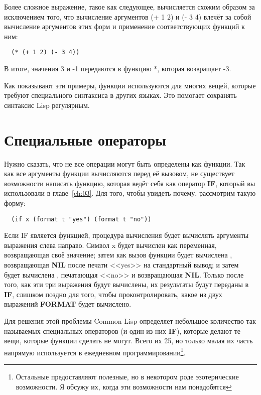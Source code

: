 Более сложное выражение, такое как следующее, вычисляется схожим образом за исключением
того, что вычисление аргументов (+ 1 2) и (- 3 4) влечёт за собой вычисление аргументов
этих форм и применение соответствующих функций к ним:

\begin{lstlisting}
  (* (+ 1 2) (- 3 4))
\end{lstlisting}

В итоге, значения 3 и -1 передаются в функцию *, которая возвращает -3.

Как показывают эти примеры, функции используются для многих вещей, которые требуют
специального синтаксиса в других языках. Это помогает сохранять синтаксис Lisp регулярным.

\section{Специальные операторы}

Нужно сказать, что не все операции могут быть определены как функции. Так как все
аргументы функции вычисляются перед её вызовом, не существует возможности написать
функцию, которая ведёт себя как оператор \textbf{IF}, который вы использовали в
главе~\ref{ch:03}. Для того, чтобы увидеть почему, рассмотрим такую форму:

\begin{lstlisting}
  (if x (format t "yes") (format t "no"))
\end{lstlisting}

Если IF является функцией, процедура вычисления будет вычислять аргументы выражения слева
направо. Символ x будет вычислен как переменная, возвращающая своё значение; затем как
вызов функции будет вычислена , возвращающая \textbf{NIL} после
печати <<yes>> на стандартный вывод; и затем будет вычислена , печатающая
<<no>> и возвращающая \textbf{NIL}. Только после того, как эти три выражения будут
вычислены, их результаты будут переданы в \textbf{IF}, слишком поздно для того, чтобы
проконтролировать, какое из двух выражений \textbf{FORMAT} будет вычислено.

Для решения этой проблемы Common Lisp определяет небольшое количество так называемых
специальных операторов (и один из них \textbf{IF}), которые делают те вещи, которые
функции сделать не могут. Всего их 25, но только малая их часть напрямую используется в
ежедневном программировании\footnote{Остальные предоставляют полезные, но в некотором роде
  эзотерические возможности. Я обсужу их, когда эти возможности нам понадобятся}.

